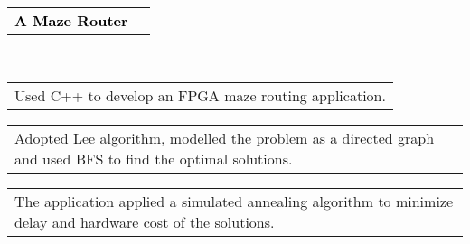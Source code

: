 \documentclass[letterpaper,10pt,english]{article}
\newcommand{\mpwidth}{\linewidth-\fboxsep-\fboxsep}
\newcommand{\cvlist}[1] {
	\begin{itemize}[left=5pt,nosep]{#1}\end{itemize}
}
\newcommand{\cvtext}[1] {
	\begin{tabular*}{1\mpwidth}{p{0.98\mpwidth}}
		\parbox{1\mpwidth}{#1}
	\end{tabular*}
}
\begin{document}
\parbox{\mpwidth}{
	\begin{tabular*}{1\mpwidth}{p{1\mpwidth}  r}
		\textcolor{black}{\textbf{A Maze Router}} \\
	\end{tabular*}\\[-8pt]
	\cvlist{
		\item{\cvtext{Used C++ to develop an FPGA maze routing application.}}
		\item{\cvtext{Adopted Lee algorithm, modelled the problem as a directed graph and used BFS to find the optimal solutions.}}
		\item{\cvtext{The application applied a simulated annealing algorithm to minimize delay and hardware cost of the solutions.}}
	}
}

	
\end{document}
